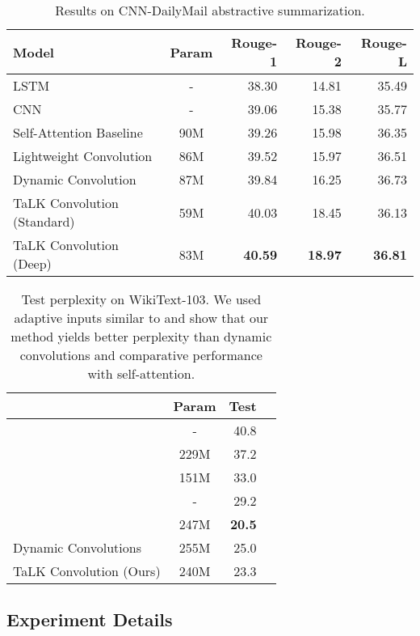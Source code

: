 \documentclass{article}
\def\talkconvfull{TaLK Convolution}
\def\wiki{WikiText-103}
\def\cnndm{CNN-DailyMail}
\begin{document}
\begin{table*}[t]
\caption{Results on \cnndm{} abstractive summarization.}
\label{tab:abs}
\vskip 0.15in
\centering
\begin{tabular}{lcrrr}
\toprule
Model & Param & Rouge-1 & Rouge-2 & Rouge-L \\    
\midrule
LSTM \cite{DBLP:journals/corr/PaulusXS17} & - & 38.30 & 14.81 &  35.49  \\ 
CNN \cite{DBLP:journals/corr/abs-1711-05217} & - & 39.06 & 15.38 & 35.77 \\
Self-Attention Baseline \cite{wu2019pay} & 90M & 39.26 & 15.98 & 36.35  \\
Lightweight Convolution \cite{wu2019pay} & 86M & 39.52 & 15.97 & 36.51  \\
Dynamic Convolution \cite{wu2019pay} & 87M & 39.84 & 16.25 & 36.73 \\
\midrule
\talkconvfull{} (Standard) & 59M & 40.03 & 18.45 & 36.13 \\
\talkconvfull{} (Deep) & 83M & \textbf{40.59} & \textbf{18.97} & \textbf{36.81} \\ 
\bottomrule
\end{tabular}
\end{table*}

\begin{table}
\centering
\caption{Test perplexity on \wiki{}. We used adaptive inputs similar to \citet{DBLP:journals/corr/abs-1809-10853} and show that our method yields better perplexity than dynamic convolutions and comparative performance with self-attention.}
\vskip 0.15in
\begin{tabular}{lcrr}
\toprule
& Param & Test \\ \midrule
\citet{DBLP:journals/corr/GraveJU16} & - & 40.8 \\
\citet{DBLP:journals/corr/DauphinFAG16}  & 229M & 37.2 \\
\citet{DBLP:journals/corr/abs-1803-08240} & 151M & 33.0  \\
\citet{DBLP:journals/corr/abs-1803-10049} & - & 29.2 \\
\citet{DBLP:journals/corr/abs-1809-10853} & 247M & \textbf{20.5} \\
\midrule
Dynamic Convolutions & 255M & 25.0 \\
\talkconvfull{} (Ours) & 240M & 23.3 \\
\bottomrule
\end{tabular}
\label{tab:wiki_best}
\end{table}

\subsection{Experiment Details}
\end{document}
